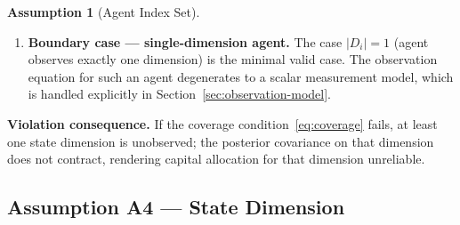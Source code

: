 \documentclass[12pt,openany]{book}
\numberwithin{equation}{chapter}
\theoremstyle{plain}
\theoremstyle{definition}
\newtheorem{assumption}[theorem]{Assumption}
\theoremstyle{remark}
\def\mathcal#1{#1}%
\begin{document}
\begin{assumption}[Agent Index Set]
\begin{enumerate}[label=\textbf{A3.\arabic*.}, leftmargin=*, widest=A3.5.]
  \item \textbf{Boundary case — single-dimension agent.}
        The case $|\mathcal{D}_i| = 1$ (agent observes exactly
        one dimension) is the minimal valid case.  The
        observation equation for such an agent degenerates to a
        scalar measurement model, which is handled explicitly
        in Section~\ref{sec:observation-model}.
\end{enumerate}

\noindent\textbf{Violation consequence.}  If the coverage
condition~\eqref{eq:coverage} fails, at least one state
dimension is unobserved; the posterior covariance on that
dimension does not contract, rendering capital allocation
for that dimension unreliable.
\end{assumption}

\subsection*{Assumption A4 — State Dimension}
\end{document}
